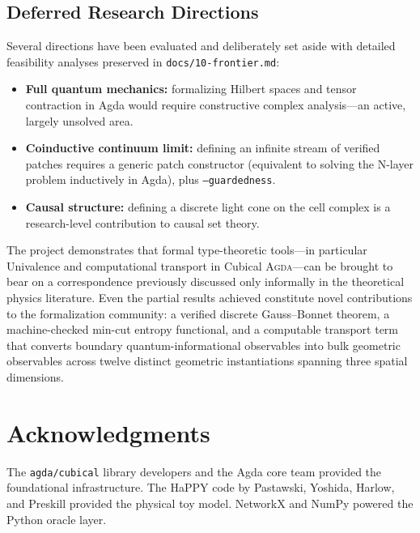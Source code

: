 \documentclass[11pt, a4paper]{article}
\theoremstyle{plain}
\theoremstyle{definition}
\newcommand{\Agda}{\textsc{Agda}}
\begin{document}
\subsection{Deferred Research Directions}

Several directions have been evaluated and deliberately set aside
with detailed feasibility analyses preserved in
\texttt{docs/10-frontier.md}:

\begin{itemize}[nosep]
  \item \textbf{Full quantum mechanics:} formalizing Hilbert spaces
    and tensor contraction in Agda would require constructive
    complex analysis---an active, largely unsolved area.
  \item \textbf{Coinductive continuum limit:} defining an infinite
    stream of verified patches requires a generic patch constructor
    (equivalent to solving the N-layer problem inductively in Agda),
    plus \texttt{--guardedness}.
  \item \textbf{Causal structure:} defining a discrete light cone
    on the cell complex is a research-level contribution to causal
    set theory.
\end{itemize}

\bigskip\noindent
The project demonstrates that formal type-theoretic tools---in
particular Univalence and computational transport in Cubical
\Agda{}---can be brought to bear on a correspondence previously
discussed only informally in the theoretical physics literature.
Even the partial results achieved constitute novel contributions to
the formalization community: a verified discrete Gauss--Bonnet
theorem, a machine-checked min-cut entropy functional, and a
computable transport term that converts boundary quantum-informational
observables into bulk geometric observables across twelve distinct
geometric instantiations spanning three spatial dimensions.

\section*{Acknowledgments}

The \texttt{agda/cubical} library developers and the Agda core team
provided the foundational infrastructure.  The HaPPY code by
Pastawski, Yoshida, Harlow, and Preskill provided the physical toy
model.  NetworkX and NumPy powered the Python oracle layer.

\end{document}
